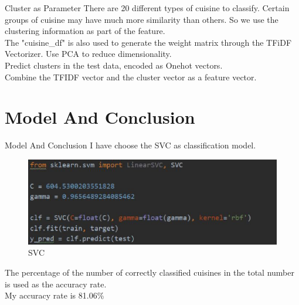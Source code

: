 \documentclass[
 size=14pt,
 paper=smartboard,  %
 mode=present, 		%
 display=slides, 	%
 style=tuliplab,  	%
 pauseslide,
 fleqn,leqno]{powerdot}
\begin{document}
\begin{slide}[toc=,bm=]{Cluster as Parameter}
	There are 20 different types of cuisine to classify. Certain groups of cuisine may have much more similarity than others. So we use the clustering information as part of the feature.\\
	
	The "cuisine\_df" is also used to generate the weight matrix through the TFiDF Vectorizer. Use PCA to reduce dimensionality.\\
	
	Predict clusters in the test data, encoded as Onehot vectors.\\
	
	Combine the TFIDF vector and the cluster vector as a feature vector.
\end{slide}

\section{Model And Conclusion}

\begin{slide}[toc=,bm=]{Model And Conclusion}
	I have choose the SVC as classification model.
	\begin{figure}[htbp]
	\includegraphics[scale=0.7]{./figure1/8.eps}
	\caption{SVC}
	\end{figure}
	The percentage of the number of correctly classified cuisines in the total number is used as the accuracy rate.\\
	My accuracy rate is 81.06\%
	
\end{slide}


\end{document}
